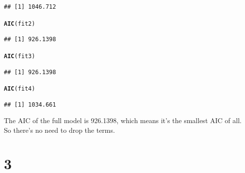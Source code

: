 \documentclass{article}\usepackage[]{graphicx}\usepackage[]{color}
\makeatletter
\newcommand{\hlstd}[1]{\textcolor[rgb]{0.345,0.345,0.345}{#1}}%
\newcommand{\hlkwd}[1]{\textcolor[rgb]{0.737,0.353,0.396}{\textbf{#1}}}%
\newenvironment{kframe}{%
 \def\at@end@of@kframe{}%
 \ifinner\ifhmode%
  \def\at@end@of@kframe{\end{minipage}}%
  \begin{minipage}{\columnwidth}%
 \fi\fi%
 \def\FrameCommand##1{\hskip\@totalleftmargin \hskip-\fboxsep
 \colorbox{shadecolor}{##1}\hskip-\fboxsep
     \hskip-\linewidth \hskip-\@totalleftmargin \hskip\columnwidth}%
 \MakeFramed {\advance\hsize-\width
   \@totalleftmargin\z@ \linewidth\hsize
   \@setminipage}}%
 {\par\unskip\endMakeFramed%
 \at@end@of@kframe}
\newenvironment{knitrout}{}{} %
\makeatother
\begin{document}
\begin{enumerate}[(a)]
\begin{knitrout}
\begin{kframe}
\begin{verbatim}
## [1] 1046.712
\end{verbatim}
\begin{alltt}
  \hlkwd{AIC}\hlstd{(fit2)}
\end{alltt}
\begin{verbatim}
## [1] 926.1398
\end{verbatim}
\begin{alltt}
  \hlkwd{AIC}\hlstd{(fit3)}
\end{alltt}
\begin{verbatim}
## [1] 926.1398
\end{verbatim}
\begin{alltt}
  \hlkwd{AIC}\hlstd{(fit4)}
\end{alltt}
\begin{verbatim}
## [1] 1034.661
\end{verbatim}
\end{kframe}
\end{knitrout}

\qquad The AIC of the full model is 926.1398, which means it's the smallest AIC of all. So there's no need to drop the terms.

\end{enumerate}

\section{3}
\end{document}
